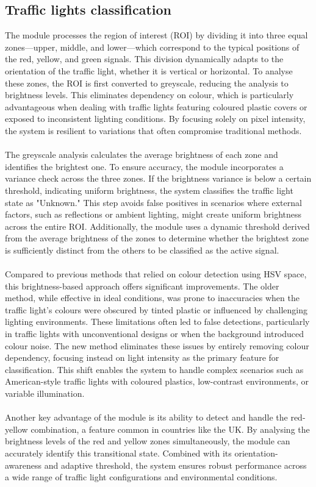 \documentclass[10pt,conference,a4paper]{IEEEtran}
\begin{document}
\subsection{Traffic lights classification}\label{ch:tl}
The module processes the region of interest (ROI) by dividing it into three equal zones—upper, middle, and lower—which correspond to the typical positions of the red, yellow, and green signals. This division dynamically adapts to the orientation of the traffic light, whether it is vertical or horizontal. To analyse these zones, the ROI is first converted to greyscale, reducing the analysis to brightness levels. This eliminates dependency on colour, which is particularly advantageous when dealing with traffic lights featuring coloured plastic covers or exposed to inconsistent lighting conditions. By focusing solely on pixel intensity, the system is resilient to variations that often compromise traditional methods.\\\\
The greyscale analysis calculates the average brightness of each zone and identifies the brightest one. To ensure accuracy, the module incorporates a variance check across the three zones. If the brightness variance is below a certain threshold, indicating uniform brightness, the system classifies the traffic light state as "Unknown." This step avoids false positives in scenarios where external factors, such as reflections or ambient lighting, might create uniform brightness across the entire ROI. Additionally, the module uses a dynamic threshold derived from the average brightness of the zones to determine whether the brightest zone is sufficiently distinct from the others to be classified as the active signal.\\\\
Compared to previous methods that relied on colour detection using HSV space, this brightness-based approach offers significant improvements. The older method, while effective in ideal conditions, was prone to inaccuracies when the traffic light's colours were obscured by tinted plastic or influenced by challenging lighting environments. These limitations often led to false detections, particularly in traffic lights with unconventional designs or when the background introduced colour noise. The new method eliminates these issues by entirely removing colour dependency, focusing instead on light intensity as the primary feature for classification. This shift enables the system to handle complex scenarios such as American-style traffic lights with coloured plastics, low-contrast environments, or variable illumination.\\\\
Another key advantage of the module is its ability to detect and handle the red-yellow combination, a feature common in countries like the UK. By analysing the brightness levels of the red and yellow zones simultaneously, the module can accurately identify this transitional state. Combined with its orientation-awareness and adaptive threshold, the system ensures robust performance across a wide range of traffic light configurations and environmental conditions.
\end{document}
